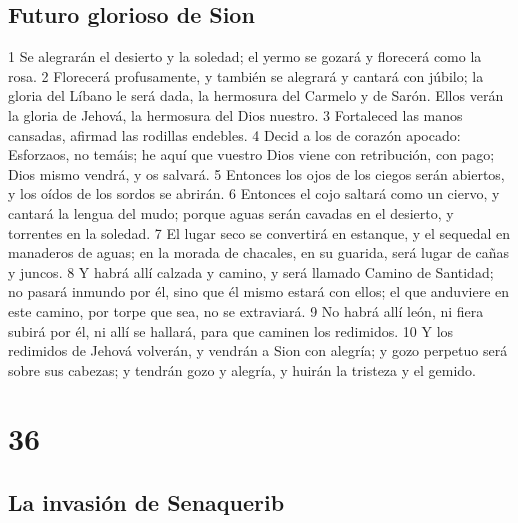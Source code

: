\section*{Futuro glorioso de Sion}

1 Se alegrarán el desierto y la soledad; el yermo se gozará y florecerá como la rosa.
2 Florecerá profusamente, y también se alegrará y cantará con júbilo; la gloria del Líbano le será dada, la hermosura del Carmelo y de Sarón. Ellos verán la gloria de Jehová, la hermosura del Dios nuestro.
3 Fortaleced las manos cansadas, afirmad las rodillas endebles. 
4 Decid a los de corazón apocado: Esforzaos, no temáis; he aquí que vuestro Dios viene con retribución, con pago; Dios mismo vendrá, y os salvará.
5 Entonces los ojos de los ciegos serán abiertos, y los oídos de los sordos se abrirán.
6 Entonces el cojo saltará como un ciervo, y cantará la lengua del mudo; porque aguas serán cavadas en el desierto, y torrentes en la soledad.
7 El lugar seco se convertirá en estanque, y el sequedal en manaderos de aguas; en la morada de chacales, en su guarida, será lugar de cañas y juncos.
8 Y habrá allí calzada y camino, y será llamado Camino de Santidad; no pasará inmundo por él, sino que él mismo estará con ellos; el que anduviere en este camino, por torpe que sea, no se extraviará.
9 No habrá allí león, ni fiera subirá por él, ni allí se hallará, para que caminen los redimidos.
10 Y los redimidos de Jehová volverán, y vendrán a Sion con alegría; y gozo perpetuo será sobre sus cabezas; y tendrán gozo y alegría, y huirán la tristeza y el gemido. 

\chapter{36}

\section*{La invasión de Senaquerib}

